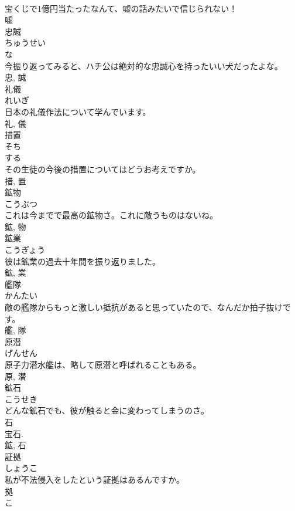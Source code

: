 \documentclass[8pt]{extreport}
\begin{document}
\begin{CJK}{UTF8}{min}
\\	宝くじで1億円当たったなんて、嘘の話みたいで信じられない！	
\\	嘘	
\\	忠誠	
\\	ちゅうせい	
\\	な 
\\	今振り返ってみると、ハチ公は絶対的な忠誠心を持ったいい犬だったよな。	
\\	忠, 誠	
\\	礼儀	
\\	れいぎ	
\\	日本の礼儀作法について学んでいます。	
\\	礼, 儀	
\\	措置	
\\	そち	
\\	する 
\\	その生徒の今後の措置についてはどうお考えですか。	
\\	措, 置	
\\	鉱物	
\\	こうぶつ	
\\	これは今までで最高の鉱物さ。これに敵うものはないね。	
\\	鉱, 物	
\\	鉱業	
\\	こうぎょう	
\\	彼は鉱業の過去十年間を振り返りました。	
\\	鉱, 業	
\\	艦隊	
\\	かんたい	
\\	敵の艦隊からもっと激しい抵抗があると思っていたので、なんだか拍子抜けです。	
\\	艦, 隊	
\\	原潜	
\\	げんせん	
\\	原子力潜水艦は、略して原潜と呼ばれることもある。	
\\	原, 潜	
\\	鉱石	
\\	こうせき	
\\	どんな鉱石でも、彼が触ると金に変わってしまうのさ。	
\\	石 
\\	宝石. 
\\	鉱, 石	
\\	証拠	
\\	しょうこ	
\\	私が不法侵入をしたという証拠はあるんですか。	
\\	拠 
\\	こ 

\end{CJK}
\end{document}
